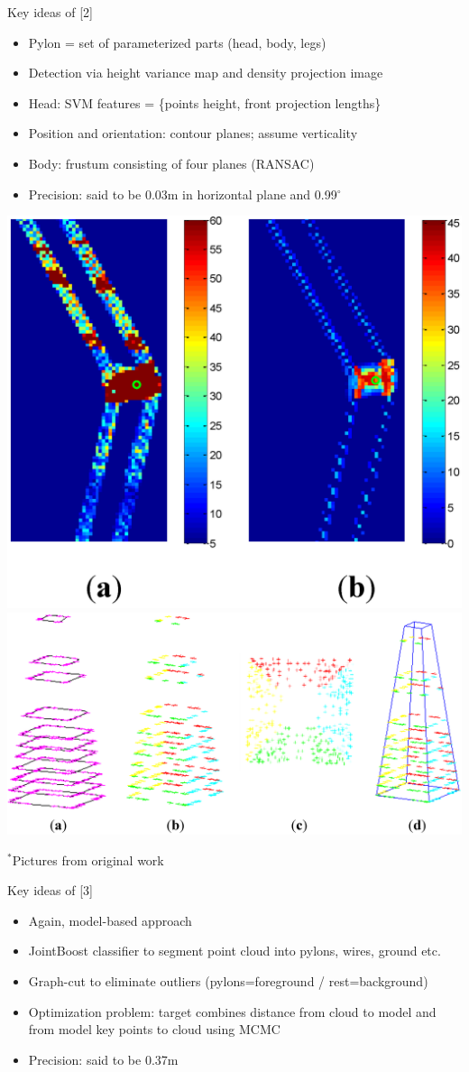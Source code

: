 \documentclass{beamer}
\begin{document}
\begin{frame}[t, fragile]{Key ideas of [2]}

\begin{itemize}
\item Pylon = set of parameterized parts (head, body, legs)
\item Detection via height variance map and density projection image
\item Head: SVM features = \{points height, front projection lengths\}
\item Position and orientation: contour planes; assume verticality
\item Body: frustum consisting of four planes (RANSAC)
\item Precision: said to be 0.03m in horizontal plane and 0.99$^\circ $
\end{itemize}
\begin{center}
\includegraphics[width=0.3\linewidth]{model_based_lidar1}
\includegraphics[width=0.5\linewidth]{model_based_lidar3}
\end{center}

\begin{flushright}
\small{$^*$Pictures from original work}
\end{flushright}
\end{frame}

\begin{frame}[t, fragile]{Key ideas of [3]}
\begin{itemize}
\item Again, model-based approach
\item JointBoost classifier to segment point cloud into pylons, wires, ground etc.
\item Graph-cut to eliminate outliers (pylons=foreground / rest=background)
\item Optimization problem: target combines distance from cloud to model and from model key points to cloud using MCMC
\item Precision: said to be 0.37m
\end{itemize}
\end{frame}
\end{document}
